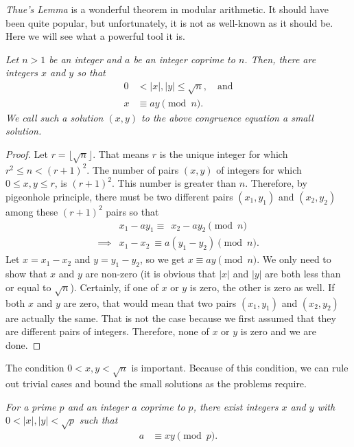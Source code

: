\documentclass{subfile}
\begin{document}
\textit{Thue's Lemma} is a wonderful theorem in modular arithmetic. It should have been quite popular, but unfortunately, it is not as well-known as it should be. Here we will see what a powerful tool it is.

\begin{theorem}\slshape
	Let $n>1$ be an integer and $a$ be an integer coprime to $n$. Then, there are integers $x$ and $y$ so that 
	\begin{align*}
		0 &< |x|, |y| \leq \sqrt n, \quad \text{and}\\
		x&\equiv ay\pmod n.
	\end{align*}\label{thm:thue}
	We call such a solution $(x,y)$ to the above congruence equation a \textit{small solution}.
\end{theorem}

\begin{proof}
	Let $r=\lfloor\sqrt{n}\rfloor$. That means $r$ is the unique integer for which $r^2\leq n<(r+1)^2$. The number of pairs $(x,y)$ of integers for which $0\leq x,y\leq r$, is $(r+1)^2$. This number is greater than $n$. Therefore, by pigeonhole principle, there must be two different pairs $(x_1,y_1)$ and $(x_2,y_2)$ among these $(r+1)^2$ pairs so that 
	\begin{align*}
		& x_1-ay_1 \equiv \ \ x_2-ay_2 \pmod n\\
		\implies & x_1-x_2 \ \equiv a(y_1-y_2) \pmod n.
	\end{align*}
	Let $x=x_1-x_2$ and $y=y_1-y_2$, so we get $x\equiv ay\pmod n$. We only need to show that $x$ and $y$ are non-zero (it is obvious that $|x|$ and $|y|$ are both less than or equal to $\sqrt n$). Certainly, if one of $x$ or $y$ is zero, the other is zero as well. If both $x$ and $y$ are zero, that would mean that two pairs $(x_1,y_1)$ and $(x_2,y_2)$ are actually the same. That is not the case because we first assumed that they are different pairs of integers. Therefore, none of $x$ or $y$ is zero and we are done.
\end{proof}
	
	\begin{note}
		The condition $0<x,y<\sqrt{n}$ is important. Because of this condition, we can rule out trivial cases and bound the small solutions as the problems require.
	\end{note}
	
	\begin{corollary}\slshape
		For a prime $p$ and an integer $a$ coprime to $p$, there exist integers $x$ and $y$ with $0<|x|,|y|<\sqrt{p}$ such that
		\begin{align*}
			a & \equiv xy\pmod p.
		\end{align*}
	\end{corollary}
	
\end{document}
